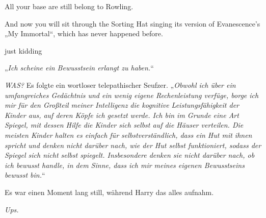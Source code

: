 
\begin{chapterOpeningAuthorNote}
All your base are still belong to Rowling.

And now you will sit through the Sorting Hat singing its version of Evanescence's „My Immortal“, which has never happened before.

just kidding
\end{chapterOpeningAuthorNote}


\hplettrineextrapara
„\emph{Ich scheine ein Bewusstsein erlangt zu haben.}“

\emph{WAS?}
Es folgte ein wortloser telepathischer Seufzer. „\emph{Obwohl ich über ein umfangreiches Gedächtnis und ein wenig eigene Rechenleistung verfüge, borge ich mir für den Großteil meiner Intelligenz die kognitive Leistungsfähigkeit der Kinder aus, auf deren Köpfe ich gesetzt werde. Ich bin im Grunde eine Art Spiegel, mit dessen Hilfe die Kinder \emph{sich selbst} auf die Häuser verteilen. Die meisten Kinder halten es einfach für selbstverständlich, dass ein Hut mit ihnen spricht und denken nicht darüber nach, wie der Hut \emph{selbst} funktioniert, sodass der Spiegel sich nicht selbst spiegelt. \emph{Insbesondere} denken sie nicht darüber nach, ob ich bewusst handle, in dem Sinne, dass ich mir meines eigenen Bewusstseins bewusst bin.}“

Es war einen Moment lang still, während Harry das alles aufnahm.

\emph{Ups.}

